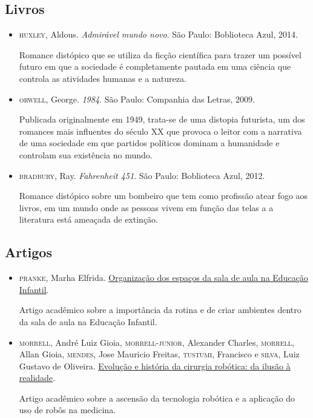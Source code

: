 \documentclass[11pt]{extarticle}
\begin{document}
\subsection{Livros} 

\begin{itemize}
\item \textsc{huxley}, Aldous. \textit{Admirável mundo novo}. São Paulo: Boblioteca Azul, 2014.

Romance distópico que se utiliza da ficção científica para trazer um possível futuro em que a sociedade é completamente pautada em uma ciência que controla as atividades humanas e a natureza.  

\item \textsc{orwell}, George. \textit{1984}. São Paulo: Companhia das Letras, 2009.

Publicada originalmente em 1949, trata-se de uma distopia futurista, um dos romances mais influentes do século XX que provoca o leitor com a narrativa de uma sociedade em que partidos políticos dominam a humanidade e controlam sua existência no mundo.

\item \textsc{bradbury}, Ray. \textit{Fahrenheit 451}. São Paulo: Boblioteca Azul, 2012.

Romance distópico sobre um bombeiro que tem como profissão atear fogo aos livros, em um mundo onde as pessoas vivem em função das telas a a literatura está ameaçada de extinção.

\end{itemize}

\subsection{Artigos}

\begin{itemize}
\item \textsc{pranke}, Marha Elfrida. \href{http://centraldeinteligenciaacademica.blogspot.com/2016/04/organizacao-dos-espacos-da-sala-de-aula.html}{Organização dos espaços da sala de aula na Educação Infantil}. 

Artigo acadêmico sobre a importância da rotina e de criar ambientes dentro da sala de aula na Educação Infantil.

\item \textsc{morrell}, André Luiz Gioia, \textsc{morrell-junior}, Alexander Charles, \textsc{morrell}, Allan Gioia, \textsc{mendes}, Jose Mauricio Freitas, \textsc{tustumi}, Francisco e \textsc{silva}, Luiz Gustavo de Oliveira. \href{https://www.scielo.br/j/rcbc/a/4qVcw3NC75jwPNtkgkhwSWf/?lang=pt}{Evolução e história da cirurgia robótica: da ilusão à realidade}. 

Artigo acadêmico sobre a ascensão da tecnologia robótica e a aplicação do uso de robôs na medicina. 
\end{itemize}
\end{document}
